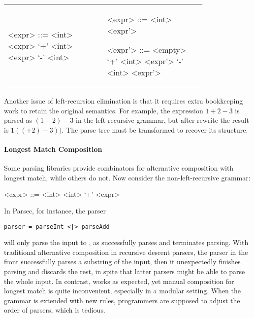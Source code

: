 \begin{tabular}{m{0.4\linewidth}m{0.4\linewidth}}
\setlength{\grammarindent}{5em}
\begin{grammar}
<expr> ::= <int> \alt <expr> `+' <int> \alt <expr> `-' <int>
\end{grammar}
&
\setlength{\grammarindent}{5em}
\begin{grammar}
<expr> ::= <int> <expr'>

<expr'> ::= <empty> \alt `+' <int> <expr'> \alt `-' <int> <expr'>
\end{grammar}
\end{tabular}


Another issue of left-recursion elimination is that it requires extra
bookkeeping work to retain the original semantics. For example, the
expression $1+2-3$ is parsed as $(1+2)-3$ in the left-recursive
grammar, but after rewrite the result is $1((+2)-3))$. The parse tree
must be transformed to recover its structure.


\paragraph{Longest Match Composition}
Some parsing libraries provide combinators for alternative composition with longest match,
while others do not. Now consider the non-left-recursive grammar:
\setlength{\grammarindent}{5em}
\begin{grammar}
<expr> ::= <int> \alt <int> `+' <expr>
\end{grammar}
In Parsec, for instance, the parser
\begin{lstlisting}[language=PlainCode]
parser = parseInt <|> parseAdd
\end{lstlisting}
will only parse the input  to , as  successfully parses 
and terminates parsing. With traditional alternative
composition in recursive descent parsers, the parser in the front successfully parses a substring of the input, then it unexpectedly
finishes parsing and discards the rest, in spite that latter parsers might be able to parse the whole input.
In contrast,  works as expected, yet manual composition for longest match is quite
inconvenient, especially in a modular setting. When the grammar is extended with new rules, programmers are supposed to adjust
the order of parsers, which is tedious.

